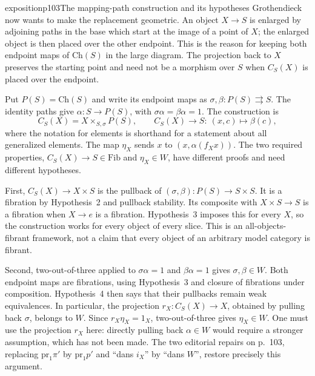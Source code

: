 \begin{dcomment}{exposition}{p103}{The mapping-path construction and its hypotheses}
Grothendieck now wants to make the replacement geometric. An object $X\to S$ is enlarged by adjoining paths in the base which start at the image of a point of $X$; the enlarged object is then placed over the other endpoint. This is the reason for keeping both endpoint maps of $\mathrm{Ch}(S)$ in the large diagram. The projection back to $X$ preserves the starting point and need not be a morphism over $S$ when $C_S(X)$ is placed over the endpoint.

Put $P(S)=\mathrm{Ch}(S)$ and write its endpoint maps as $\sigma,\beta:P(S)\rightrightarrows S$. The identity paths give $\alpha:S\to P(S)$, with $\sigma\alpha=\beta\alpha=1$. The construction is
\[
C_S(X)=X\times_{S,\sigma}P(S),\qquad
C_S(X)\longrightarrow S:\ (x,c)\longmapsto\beta(c),
\]
where the notation for elements is shorthand for a statement about all generalized elements. The map $\eta_X$ sends $x$ to $(x,\alpha(f_Xx))$. The two required properties, $C_S(X)\to S\in\mathrm{Fib}$ and $\eta_X\in W$, have different proofs and need different hypotheses.

First, $C_S(X)\to X\times S$ is the pullback of $(\sigma,\beta):P(S)\to S\times S$. It is a fibration by Hypothesis~2 and pullback stability. Its composite with $X\times S\to S$ is a fibration when $X\to e$ is a fibration. Hypothesis~3 imposes this for every $X$, so the construction works for every object of every slice. This is an all-objects-fibrant framework, not a claim that every object of an arbitrary model category is fibrant.

Second, two-out-of-three applied to $\sigma\alpha=1$ and $\beta\alpha=1$ gives $\sigma,\beta\in W$. Both endpoint maps are fibrations, using Hypothesis~3 and closure of fibrations under composition. Hypothesis~4 then says that their pullbacks remain weak equivalences. In particular, the projection $r_X:C_S(X)\to X$, obtained by pulling back $\sigma$, belongs to $W$. Since $r_X\eta_X=1_X$, two-out-of-three gives $\eta_X\in W$. One must use the projection $r_X$ here: directly pulling back $\alpha\in W$ would require a stronger assumption, which has not been made. The two editorial repairs on p.~103, replacing $\mathrm{pr}_1\pi'$ by $\mathrm{pr}_1p'$ and ``dans $i_X$'' by ``dans $W$'', restore precisely this argument.


\end{dcomment}
